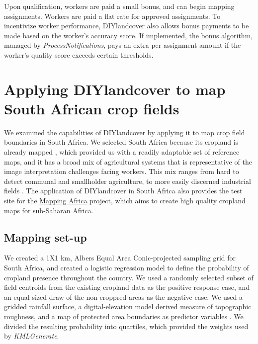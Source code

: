\documentclass[preprint,12pt,authoryear]{elsarticle}
\begin{document}
Upon qualification, workers are paid a small bonus, and can begin mapping assignments. Workers are paid a flat rate for approved assignments. To incentivize worker performance, DIYlandcover also allows bonus payments to be made based on the worker's accuracy score. If implemented, the bonus algorithm, managed by \emph{ProcessNotifications}, pays an extra per assignment amount if the worker's quality score exceeds certain thresholds.

\section{Applying DIYlandcover to map South African crop fields}
We examined the capabilities of DIYlandcover by applying it to map crop field boundaries in South Africa. We selected South Africa because its cropland is already mapped \citep[see section 2;][]{geoterraimage_south_2008}, which provided us with a readily adaptable set of reference maps, and it has a broad mix of agricultural systems that is representative of the image interpretation challenges facing workers. This mix ranges from hard to detect communal and smallholder agriculture, to more easily discerned industrial fields \citep{hardy_rainfed_2011}. The application of DIYlandcover in South Africa also provides the test site for the \href{http://mappingafrica.princeton.edu}{Mapping Africa} project, which aims to create high quality cropland maps for sub-Saharan Africa. 

\subsection{Mapping set-up}
We created a 1X1 km, Albers Equal Area Conic-projected sampling grid for South Africa, and created a logistic regression model to define the probability of cropland presence throughout the country. We used a randomly selected subset of field centroids from the existing cropland data as the positive response case, and an equal sized draw of the non-croppred areas as the negative case. We used a gridded rainfall surface, a digital-elevation model derived measure of topographic roughness, and a map of protected area boundaries as predictor variables \citep[for further details on these variables and see][]{estes_comparing_2013,estes_using_2014}. We divided the resulting probability into quartiles, which provided the weights used by \emph{KMLGenerate}.
\end{document}
